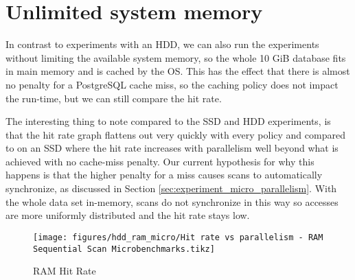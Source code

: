 \section{Unlimited system memory}
In contrast to experiments with an HDD, we can also run the experiments without limiting the available system memory, so the whole 10 GiB database fits in main memory and is cached by the OS. This has the effect that there is almost no penalty for a PostgreSQL cache miss, so the caching policy does not impact the run-time, but we can still compare the hit rate.

The interesting thing to note compared to the SSD and HDD experiments, is that the hit rate graph flattens out very quickly with every policy and compared to on an SSD where the hit rate increases with parallelism well beyond what is achieved with no cache-miss penalty. Our current hypothesis for why this happens is that the higher penalty for a miss causes scans to automatically synchronize, as discussed in Section \ref{sec:experiment_micro_parallelism}. %
With the whole data set in-memory, scans do not synchronize in this way so accesses are more uniformly distributed and the hit rate stays low.


\begin{figure}[ht]
    \centering
    \texttt{[image: figures/hdd\_ram\_micro/Hit rate vs parallelism - RAM Sequential Scan Microbenchmarks.tikz]}
    \caption{RAM Hit Rate}
    \label{fig:ram_hitrate}
\end{figure}
